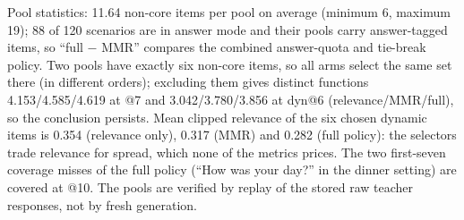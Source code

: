 Pool statistics: 11.64 non-core items per pool on average (minimum 6, maximum 19); 88 of 120 scenarios are in answer mode and their pools carry answer-tagged items, so ``full $-$ MMR'' compares the combined answer-quota and tie-break policy. Two pools have exactly six non-core items, so all arms select the same set there (in different orders); excluding them gives distinct functions 4.153/4.585/4.619 at @7 and 3.042/3.780/3.856 at dyn@6 (relevance/MMR/full), so the conclusion persists. Mean clipped relevance of the six chosen dynamic items is 0.354 (relevance only), 0.317 (MMR) and 0.282 (full policy): the selectors trade relevance for spread, which none of the metrics prices. The two first-seven coverage misses of the full policy (``How was your day?'' in the dinner setting) are covered at @10. The pools are verified by replay of the stored raw teacher responses, not by fresh generation. %

